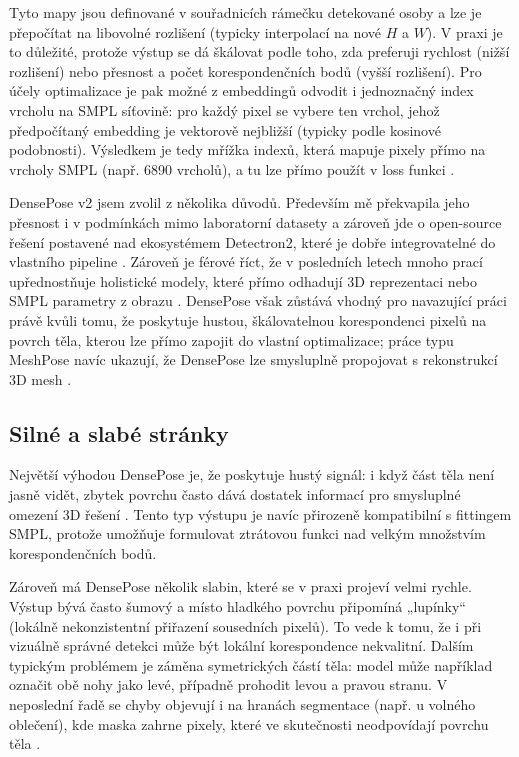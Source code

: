 \documentclass[11pt,a4paper,twoside,openright]{report}
\begin{document}
Tyto mapy jsou definované v souřadnicích rámečku detekované osoby a lze je přepočítat na libovolné rozlišení (typicky interpolací na nové $H$ a $W$). V praxi je to důležité, protože výstup se dá škálovat podle toho, zda preferuji rychlost (nižší rozlišení) nebo přesnost a počet korespondenčních bodů (vyšší rozlišení). Pro účely optimalizace je pak možné z embeddingů odvodit i jednoznačný index vrcholu na SMPL síťovině: pro každý pixel se vybere ten vrchol, jehož předpočítaný embedding je vektorově nejbližší (typicky podle kosinové podobnosti). Výsledkem je tedy mřížka indexů, která mapuje pixely přímo na vrcholy SMPL (např. 6890 vrcholů), a tu lze přímo použít v loss funkci \cite{le2024meshpose}.

DensePose v2 jsem zvolil z několika důvodů. Především mě překvapila jeho přesnost i v podmínkách mimo laboratorní datasety a zároveň jde o open-source řešení postavené nad ekosystémem Detectron2, které je dobře integrovatelné do vlastního pipeline \cite{wu2019detectron2}. Zároveň je férové říct, že v posledních letech mnoho prací upřednostňuje holistické modely, které přímo odhadují 3D reprezentaci nebo SMPL parametry z obrazu \cite{pavlakos2019expressive,wang2024prompthmr}. DensePose však zůstává vhodný pro navazující práci právě kvůli tomu, že poskytuje hustou, škálovatelnou korespondenci pixelů na povrch těla, kterou lze přímo zapojit do vlastní optimalizace; práce typu MeshPose navíc ukazují, že DensePose lze smysluplně propojovat s rekonstrukcí 3D mesh \cite{le2024meshpose}.

\subsection{Silné a slabé stránky}

Největší výhodou DensePose je, že poskytuje hustý signál: i když část těla není jasně vidět, zbytek povrchu často dává dostatek informací pro smysluplné omezení 3D řešení \cite{guler2018densepose}. Tento typ výstupu je navíc přirozeně kompatibilní s fittingem SMPL, protože umožňuje formulovat ztrátovou funkci nad velkým množstvím korespondenčních bodů.

Zároveň má DensePose několik slabin, které se v praxi projeví velmi rychle. Výstup bývá často šumový a místo hladkého povrchu připomíná „lupínky“ (lokálně nekonzistentní přiřazení sousedních pixelů). To vede k tomu, že i při vizuálně správné detekci může být lokální korespondence nekvalitní. Dalším typickým problémem je záměna symetrických částí těla: model může například označit obě nohy jako levé, případně prohodit levou a pravou stranu. V neposlední řadě se chyby objevují i na hranách segmentace (např. u volného oblečení), kde maska zahrne pixely, které ve skutečnosti neodpovídají povrchu těla \cite{guler2018densepose,le2024meshpose}.
\end{document}
